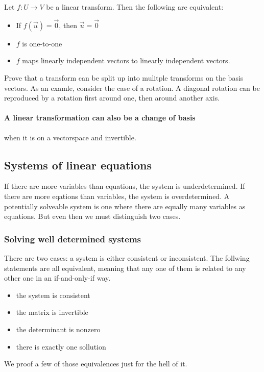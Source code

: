 Let $f: U \to V$ be a linear transform. Then the following are equivalent: 
\begin{itemize}
    \item If $f(\vec{u}) = \vec{0}$, then $\vec{u} = \vec{0}$
    \item $f$ is one-to-one
    \item $f$ maps linearly independent vectors to linearly independent vectors. 
\end{itemize}


Prove that a transform can be split up into mulitple transforms on the basis vectors. 
As an examle, consider the case of a rotation. A diagonal rotation can be reproduced by a rotation first around one, then around another axis. 


\paragraph{A linear transformation can also be a change of basis} when it is on a vectorspace and invertible.


\subsection{Systems of linear equations}
If there are more variables than equations, the system is underdetermined. If there are more eqations than variables, the system is overdetermined. A potentially solveable system is one where there are equally many variables as equations. But even then we must distinguish two cases. 

\subsubsection{Solving well determined systems}
There are two cases: a system is either consistent or inconsistent. The follwing statements are all equivalent, meaning that any one of them is related to any other one in an if-and-only-if way. 

\begin{itemize}
    \item the system is consistent
    \item the matrix is invertible
    \item the determinant is nonzero
    \item there is exactly one sollution
\end{itemize}

We proof a few of those equivalences just for the hell of it. 


